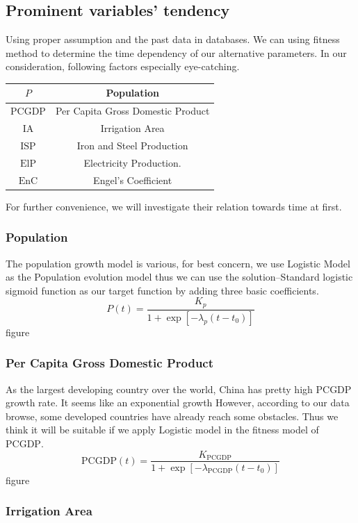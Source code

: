   \subsection{Prominent variables' tendency}
  Using proper assumption and the past data in databases. We can using fitness method to determine the time dependency of our alternative parameters.
  In our consideration, following factors especially eye-catching.
  \begin{table}[!h]
  \begin{tabular}{|c|c|}
  \hline
  $P$ & Population \\
  \hline
  $\text{PCGDP}$ & Per Capita Gross Domestic Product \\
  \hline
  $\text{IA}$ & Irrigation Area \\
  \hline
  $\text{ISP}$ & Iron and Steel Production \\
  \hline
  $\text{ElP}$ & Electricity Production. \\
  \hline
  $\text{EnC}$ & Engel's Coefficient \\
  \hline
  \end{tabular}
  \end{table}
  For further convenience, we will investigate their relation towards time at first.
    \subsubsection{Population}
      The population growth model is various, for best concern, we use Logistic Model as the Population evolution model thus we can use the solution--Standard logistic sigmoid function as our target function by adding three basic coefficients.
      $$
      P(t) = \frac{K_p}{1+\exp[-\lambda_p(t-t_0)]}
      $$
      {\huge figure}
    \subsubsection{Per Capita Gross Domestic Product}
      As the largest developing country over the world, China has pretty high PCGDP growth rate. It seems like an exponential growth However, according to our data browse, some developed countries have already reach some obstacles. Thus we think it will be suitable if we apply Logistic model in the fitness model of $\text{PCGDP}$.
      $$
      \text{PCGDP}(t) = \frac{K_\text{PCGDP}}{1+\exp[-\lambda_\text{PCGDP}(t-t_0)]}
      $$
      {\huge figure}
    \subsubsection{Irrigation Area}

